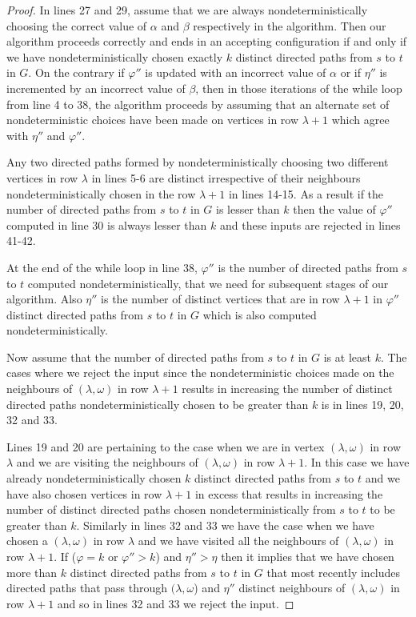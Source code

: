 \documentclass{amsbook}
\theoremstyle{definition}
\theoremstyle{remark}
\numberwithin{section}{chapter}
\numberwithin{equation}{chapter}
\begin{document}
\begin{proof}
In lines 27 and 29, assume that we are always nondeterministically choosing the correct value of $\alpha $ and $\beta$ respectively in the algorithm. Then our algorithm proceeds correctly and ends in an accepting configuration if and only if we have nondeterministically chosen exactly $k$ distinct directed paths from $s$ to $t$ in $G$. On the contrary if $\varphi ''$ is updated with an incorrect value of $\alpha$ or if $\eta ''$ is incremented by an incorrect value of $\beta$, then in those iterations of the while loop from line 4 to 38, the algorithm proceeds by assuming that an alternate set of nondeterministic choices have been made on vertices in row $\lambda +1$ which agree with $\eta ''$ and $\varphi ''$.

Any two directed paths formed by nondeterministically choosing two different vertices in row $\lambda$ in lines 5-6 are distinct irrespective of their neighbours nondeterministically chosen in the row $\lambda +1$ in lines 14-15. As a result if the number of directed paths from $s$ to $t$ in $G$ is lesser than $k$ then the value of $\varphi ''$ computed in line 30 is always lesser than $k$ and these inputs are rejected in lines 41-42.

At the end of the while loop in line 38, $\varphi ''$ is the number of directed paths from $s$ to $t$ computed nondeterministically, that we need for subsequent stages of our algorithm. Also $\eta ''$ is the number of distinct vertices that are in row $\lambda +1$ in $\varphi ''$ distinct directed paths from $s$ to $t$ in $G$ which is also computed nondeterministically.

Now assume that the number of directed paths from $s$ to $t$ in $G$ is at least $k$. The cases where we reject the input since the nondeterministic choices made on the neighbours of $(\lambda ,\omega)$ in row $\lambda +1$ results in increasing the number of distinct directed paths nondeterministically chosen to be greater than $k$ is in lines 19, 20, 32 and 33.

Lines 19 and 20 are pertaining to the case when we are in vertex $(\lambda ,\omega)$ in row $\lambda$ and we are visiting the neighbours of $(\lambda ,\omega)$ in row $\lambda +1$. In this case we have already nondeterministically chosen $k$ distinct directed paths from $s$ to $t$ and we have also chosen vertices in row $\lambda +1$ in excess that results in increasing the number of distinct directed paths chosen nondeterministically from $s$ to $t$ to be greater than $k$. Similarly in lines 32 and 33 we have the case when we have chosen a $(\lambda ,\omega )$ in row $\lambda$ and we have visited all the neighbours of $(\lambda ,\omega )$ in row $\lambda +1$. If {\rm (}$\varphi =k$ or $\varphi ''>k${\rm )} and $\eta ''>\eta$ then it implies that we have chosen more than $k$ distinct directed paths from $s$ to $t$ in $G$ that most recently includes directed paths that pass through $(\lambda ,\omega$) and $\eta ''$ distinct neighbours of $(\lambda ,\omega)$ in row $\lambda +1$ and so in lines 32 and 33 we reject the input.


\end{proof}
\end{document}
